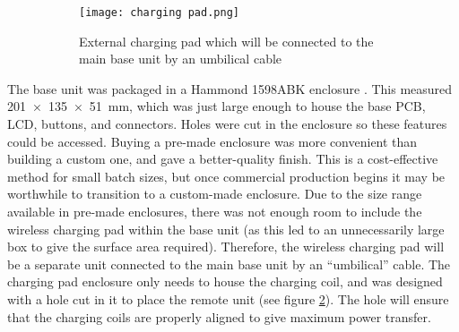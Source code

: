 \begin{figure}[htbp]
	\centering
	\begin{subfigure}[b]{0.4\linewidth}
		\texttt{[image: charging pad.png]}
		\caption{External charging pad which will be connected to the main base unit by an umbilical cable}
		\label{fig: charging pad}
	\end{subfigure}
	\caption{}
\end{figure}

The base unit was packaged in a Hammond 1598ABK enclosure \cite{hammond}. This measured \SI{201x135x51}{\milli\metre}, which was just large enough to house the base PCB, LCD, buttons, and connectors. Holes were cut in the enclosure so these features could be accessed. Buying a pre-made enclosure was more convenient than building a custom one, and gave a better-quality finish. This is a cost-effective method for small batch sizes, but once commercial production begins it may be worthwhile to transition to a custom-made enclosure. Due to the size range available in pre-made enclosures, there was not enough room to include the wireless charging pad within the base unit (as this led to an unnecessarily large box to give the surface area required). Therefore, the wireless charging pad will be a separate unit connected to the main base unit by an ``umbilical'' cable. The charging pad enclosure only needs to house the charging coil, and was designed with a hole cut in it to place the remote unit (see figure \ref{fig: charging pad}). The hole will ensure that the charging coils are properly aligned to give maximum power transfer.\\

